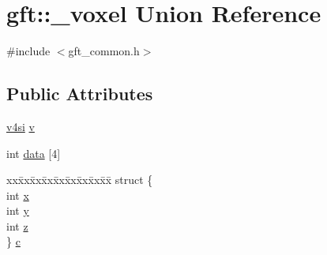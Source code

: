 \hypertarget{uniongft_1_1__voxel}{\section{gft\-:\-:\-\_\-voxel Union Reference}
\label{uniongft_1_1__voxel}
}


{\ttfamily \#include $<$gft\-\_\-common.\-h$>$}

\subsection*{Public Attributes}
\begin{DoxyCompactItemize}
\item 
\hyperlink{namespacegft_aba3889d81ba015326f093206316745b7}{v4si} \hyperlink{uniongft_1_1__voxel_a2d02a792ebdbe150d40c793c411427cc}{v}
\item 
int \hyperlink{uniongft_1_1__voxel_ab9da4ff03d07abfb109290aa6c89bbfa}{data} \mbox{[}4\mbox{]}
\item 
\begin{tabbing}
xx\=xx\=xx\=xx\=xx\=xx\=xx\=xx\=xx\=\kill
struct \{\\
\>int \hyperlink{uniongft_1_1__voxel_a92cbd3417badf2a82c1d67e1dca64f2c}{x}\\
\>int \hyperlink{uniongft_1_1__voxel_a306aef8adb8d3f922f25b1e967f05a8e}{y}\\
\>int \hyperlink{uniongft_1_1__voxel_a0aa0b6dd2c8fc9c40ba3ddb3ac3f610b}{z}\\
\} \hyperlink{uniongft_1_1__voxel_a09994e1c11c4d497bab28c94f31310b6}{c}\\

\end{tabbing}\end{DoxyCompactItemize}


